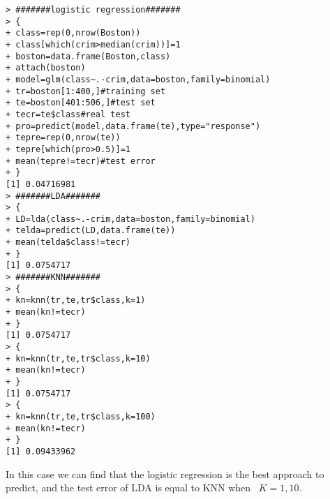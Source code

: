 \documentclass[12pt]{article}
\begin{document}
\begin{itemize}
\begin{verbatim}
> #######logistic regression#######
> {
+ class=rep(0,nrow(Boston))
+ class[which(crim>median(crim))]=1
+ boston=data.frame(Boston,class)
+ attach(boston)
+ model=glm(class~.-crim,data=boston,family=binomial)
+ tr=boston[1:400,]#training set
+ te=boston[401:506,]#test set
+ tecr=te$class#real test
+ pro=predict(model,data.frame(te),type="response")
+ tepre=rep(0,nrow(te))
+ tepre[which(pro>0.5)]=1
+ mean(tepre!=tecr)#test error
+ }
[1] 0.04716981
> #######LDA#######
> {
+ LD=lda(class~.-crim,data=boston,family=binomial)
+ telda=predict(LD,data.frame(te))
+ mean(telda$class!=tecr)
+ }
[1] 0.0754717
> #######KNN#######
> {
+ kn=knn(tr,te,tr$class,k=1)
+ mean(kn!=tecr)
+ }
[1] 0.0754717
> {
+ kn=knn(tr,te,tr$class,k=10)
+ mean(kn!=tecr)
+ }
[1] 0.0754717
> {
+ kn=knn(tr,te,tr$class,k=100)
+ mean(kn!=tecr)
+ }
[1] 0.09433962
\end{verbatim}
In this case we can find that the logistic regression is the best approach to predict, and the test error of LDA is equal to KNN when \ $K=1,10$.
\end{itemize}
\end{document}
